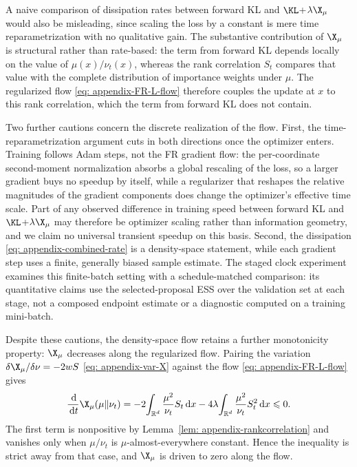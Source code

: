 \documentclass{article}
\begin{document}
A naive comparison of dissipation rates between forward KL and $\KL$+$\lambda\X_\mu$ would also be misleading, since scaling the loss by a constant is mere time reparametrization with no qualitative gain. The substantive contribution of $\X_\mu$ is structural rather than rate-based: the term from forward KL depends locally on the value of $\mu(x)/\nu_t(x)$, whereas the rank correlation $S_t$ compares that value with the complete distribution of importance weights under $\mu$. The regularized flow \eqref{eq: appendix-FR-L-flow} therefore couples the update at $x$ to this rank correlation, which the term from forward KL does not contain.

Two further cautions concern the discrete realization of the flow. First, the time-reparametrization argument cuts in both directions once the optimizer enters. Training follows Adam steps, not the FR gradient flow: the per-coordinate second-moment normalization absorbs a global rescaling of the loss, so a larger gradient buys no speedup by itself, while a regularizer that reshapes the relative magnitudes of the gradient components does change the optimizer's effective time scale. Part of any observed difference in training speed between forward KL and $\KL$+$\lambda\X_\mu$ may therefore be optimizer scaling rather than information geometry, and we claim no universal transient speedup on this basis. Second, the dissipation \eqref{eq: appendix-combined-rate} is a density-space statement, while each gradient step uses a finite, generally biased sample estimate. The staged clock experiment examines this finite-batch setting with a schedule-matched comparison: its quantitative claims use the selected-proposal ESS over the validation set at each stage, not a composed endpoint estimate or a diagnostic computed on a training mini-batch.

Despite these cautions, the density-space flow retains a further monotonicity property: $\X_\mu$ decreases along the regularized flow. Pairing the variation $\delta\X_\mu/\delta\nu = -2wS$ \eqref{eq: appendix-var-X} against the flow \eqref{eq: appendix-FR-L-flow} gives
\begin{equation*}
    \frac{\D}{\D t}\X_\mu(\mu\|\nu_t) = -2\!\int_{\mathbb R^d}\frac{\mu^2}{\nu_t} S_t \D x - 4\lambda\!\int_{\mathbb R^d}\frac{\mu^2}{\nu_t} S_t^2 \D x  \Le  0.
\end{equation*}
The first term is nonpositive by Lemma~\ref{lem: appendix-rankcorrelation} and vanishes only when $\mu/\nu_t$ is $\mu$-almost-everywhere constant. Hence the inequality is strict away from that case, and $\X_\mu$ is driven to zero along the flow.
\end{document}
